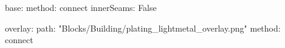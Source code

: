 base:
  method: connect
  innerSeams: False

overlay:
  path: "Blocks/Building/plating_lightmetal_overlay.png"
  method: connect